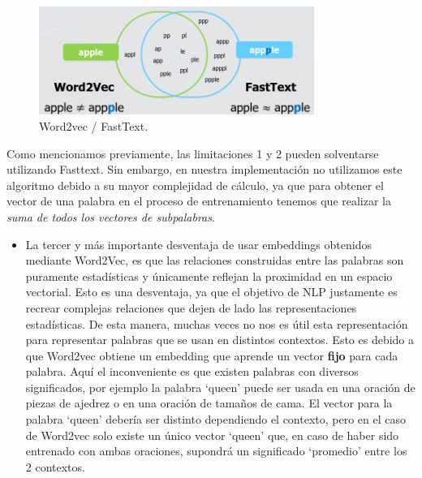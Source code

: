 \documentclass[12pt,a4paper]{article}
\begin{document}
\begin{sloppypar}
\begin{itemize}
\begin{figure}[H]    
 \centering
 \includegraphics[width=0.8\textwidth]{images/NLP/32.png}
 \caption{Word2vec / FastText\cite{NLP_28}. }
 \label{fig:Imagen_NLP_32}
\end{figure}

\end{itemize}

Como mencionamos previamente, las limitaciones 1 y 2 pueden solventarse utilizando Fasttext. Sin embargo, en nuestra implementación no utilizamos este algoritmo debido a su mayor complejidad de cálculo, ya que para obtener el vector de una palabra en el proceso de entrenamiento tenemos que realizar la \textit{suma de todos los vectores de subpalabras}.

\begin{itemize}

\item La tercer y más importante desventaja de usar embeddings obtenidos mediante Word2Vec\cite{NLP_26}, es que las relaciones construidas entre las palabras son puramente estadísticas y únicamente reflejan la proximidad en un espacio vectorial. Esto es una desventaja, ya que el objetivo de NLP justamente es recrear complejas relaciones que dejen de lado las representaciones estadísticas. De esta manera, muchas veces no nos es útil esta representación para representar palabras que se usan en distintos contextos. Esto es debido a que Word2vec obtiene un embedding que aprende un vector \textbf{fijo} para cada palabra. Aquí el inconveniente es que existen palabras con diversos significados, por ejemplo la palabra ‘queen’ puede ser usada en una oración de piezas de ajedrez o en una oración de tamaños de cama. El vector para la palabra ‘queen’ debería ser distinto dependiendo el contexto, pero en el caso de Word2vec solo existe un único vector ‘queen’ que, en caso de haber sido entrenado con ambas oraciones, supondrá un significado ‘promedio’ entre los 2 contextos. 

\end{itemize}


\end{sloppypar}
\end{document}

